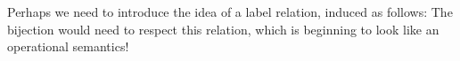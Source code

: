 Perhaps we need to introduce the idea of a label relation, induced
as follows:
The bijection would need to respect this relation,
which is beginning to look like an operational semantics!
